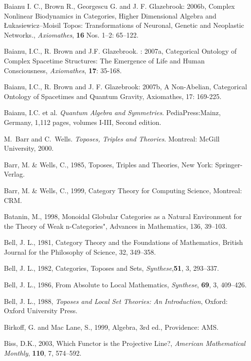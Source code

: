 \documentclass[12pt]{article}
\begin{document}
\begin{thebibliography}{399}
Baianu I. C., Brown R., Georgescu G. and J. F. Glazebrook: 2006b, Complex Nonlinear Biodynamics in Categories, Higher Dimensional Algebra and \L ukasiewicz--Moisil Topos: Transformations of Neuronal, Genetic and Neoplastic Networks., \emph{Axiomathes}, \textbf{16} Nos. 1--2: 65--122.

Baianu, I.C., R. Brown and J.F. Glazebrook. : 2007a, Categorical Ontology of Complex Spacetime Structures: The Emergence of Life and Human Consciousness, \emph{Axiomathes}, \textbf{17}: 35-168.

Baianu, I.C.,  R. Brown and J. F. Glazebrook: 2007b, A Non-Abelian, Categorical Ontology of Spacetimes and Quantum Gravity, Axiomathes, 17: 169-225.

Baianu, I.C. et al. {\em Quantum Algebra and Symmetries}. PediaPress:Mainz, Germany, 1,112 pages, volumes I-III, Second edition. 

M.~Barr and C.~Wells. {\em Toposes, Triples and Theories}. Montreal: McGill University, 2000.

Barr, M. \& Wells, C., 1985, Toposes, Triples and Theories, New York: Springer-Verlag.
 
Barr, M. \& Wells, C., 1999, Category Theory for Computing Science, Montreal: CRM. 
 
Batanin, M., 1998, Monoidal Globular Categories as a Natural Environment for the Theory of Weak n-Categories", Advances in Mathematics, 136, 39--103.   

Bell, J. L., 1981, Category Theory and the Foundations of Mathematics, British Journal for the Philosophy of Science, 32, 349--358. 
 
Bell, J. L., 1982, Categories, Toposes and Sets, {\em Synthese},{\bf 51}, 3, 293--337. 
 
Bell, J. L., 1986, From Absolute to Local Mathematics, {\em Synthese}, {\bf 69}, 3, 409--426. 

Bell, J. L., 1988, {\em Toposes and Local Set Theories: An Introduction}, Oxford: Oxford University Press. 

Birkoff, G. and Mac Lane, S., 1999, Algebra, 3rd ed., Providence: AMS.  

Biss, D.K., 2003, Which Functor is the Projective Line?, {\em American Mathematical Monthly}, {\bf 110}, 7, 574--592. 


\end{thebibliography}
\end{document}
